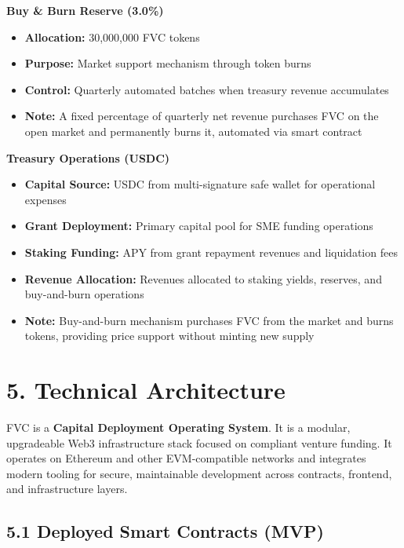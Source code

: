 \documentclass[
  paper=a4,
  ,captions=tableheading
]{scrartcl}
\providecommand{\tightlist}{%
  \setlength{\itemsep}{0pt}\setlength{\parskip}{0pt}}
\begin{document}
\textbf{Buy \& Burn Reserve (3.0\%)}

\begin{itemize}
\tightlist
\item
  \textbf{Allocation:} 30,000,000 FVC tokens
\item
  \textbf{Purpose:} Market support mechanism through token burns
\item
  \textbf{Control:} Quarterly automated batches when treasury revenue accumulates
\item
  \textbf{Note:} A fixed percentage of quarterly net revenue purchases FVC on the open market and permanently burns it, automated via smart contract
\end{itemize}

\textbf{Treasury Operations (USDC)}

\begin{itemize}
\tightlist
\item
  \textbf{Capital Source:} USDC from multi-signature safe wallet for operational expenses
\item
  \textbf{Grant Deployment:} Primary capital pool for SME funding operations
\item
  \textbf{Staking Funding:} APY from grant repayment revenues and liquidation fees
\item
  \textbf{Revenue Allocation:} Revenues allocated to staking yields, reserves, and buy-and-burn operations
\item
  \textbf{Note:} Buy-and-burn mechanism purchases FVC from the market and burns tokens, providing price support without minting new supply
\end{itemize}


\section{5. Technical Architecture}\label{technical-architecture}

FVC is a \textbf{Capital Deployment Operating System}. It is a modular, upgradeable Web3 infrastructure stack focused
on compliant venture funding. It operates on Ethereum and other EVM-compatible
networks and integrates modern tooling for secure, maintainable
development across contracts, frontend, and infrastructure layers.

\subsection{5.1 Deployed Smart Contracts (MVP)}\label{deployed-smart-contracts}
\end{document}
